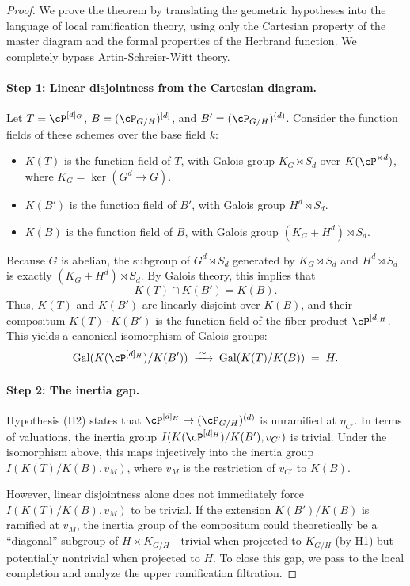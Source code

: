 \begin{proof}
We prove the theorem by translating the geometric hypotheses into the language of local ramification theory, using only the Cartesian property of the master diagram and the formal properties of the Herbrand function. We completely bypass Artin-Schreier-Witt theory.

\paragraph{Step 1: Linear disjointness from the Cartesian diagram.}
Let $T = \cP^{[d]_G}$, $B = (\cP_{G/H})^{[d]}$, and $B' = (\cP_{G/H})^{(d)}$. 
Consider the function fields of these schemes over the base field $k$:
\begin{itemize}
    \item $K(T)$ is the function field of $T$, with Galois group $K_G \rtimes S_d$ over $K(\cP^{\times d})$, where $K_G = \ker(G^d \to G)$.
    \item $K(B')$ is the function field of $B'$, with Galois group $H^d \rtimes S_d$.
    \item $K(B)$ is the function field of $B$, with Galois group $(K_G + H^d) \rtimes S_d$.
\end{itemize}
Because $G$ is abelian, the subgroup of $G^d \rtimes S_d$ generated by $K_G \rtimes S_d$ and $H^d \rtimes S_d$ is exactly $(K_G + H^d) \rtimes S_d$. By Galois theory, this implies that
\[
K(T) \cap K(B') = K(B).
\]
Thus, $K(T)$ and $K(B')$ are linearly disjoint over $K(B)$, and their compositum $K(T)\cdot K(B')$ is the function field of the fiber product $\cP^{[d]_H}$. This yields a canonical isomorphism of Galois groups:
\[
\operatorname{Gal}(K(\cP^{[d]_H})/K(B')) \;\xrightarrow{\;\sim\;}\; \operatorname{Gal}(K(T)/K(B)) \;=\; H.
\]

\paragraph{Step 2: The inertia gap.}
Hypothesis (H2) states that $\cP^{[d]_H} \to (\cP_{G/H})^{(d)}$ is unramified at $\eta_{C'}$. In terms of valuations, the inertia group $I(K(\cP^{[d]_H})/K(B'), v_{C'})$ is trivial. Under the isomorphism above, this maps injectively into the inertia group $I(K(T)/K(B), v_M)$, where $v_M$ is the restriction of $v_{C'}$ to $K(B)$. 

However, linear disjointness alone does not immediately force $I(K(T)/K(B), v_M)$ to be trivial. If the extension $K(B')/K(B)$ is ramified at $v_M$, the inertia group of the compositum could theoretically be a ``diagonal'' subgroup of $H \times K_{G/H}$---trivial when projected to $K_{G/H}$ (by H1) but potentially nontrivial when projected to $H$. To close this gap, we pass to the local completion and analyze the upper ramification filtration.


\end{proof}
